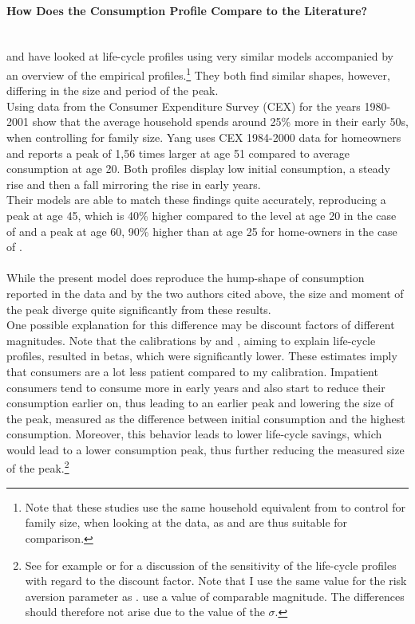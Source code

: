 \documentclass[a4paper,12pt,legno]{article}
\newcommand{\myparagraph}[1]{\paragraph{#1}\mbox{}\\}
\begin{document}
\myparagraph{How Does the Consumption Profile Compare to the Literature?} \cite{FV&K2011} and \cite{yang2009} have looked at life-cycle profiles using very similar models accompanied by an overview of the empirical profiles.\footnote{Note that these studies use the same household equivalent from \cite{fernandez2007consumption} to control for family size, when looking at the data, as \cite{hintermaier2011} and are thus suitable for comparison.} They both find similar shapes, however, differing in the size and period of the peak.\\
Using data from the Consumer Expenditure Survey (CEX) for the years 1980-2001 \cite{FV&K2011} show that the average household spends around 25\% more in their early 50s, when controlling for family size. Yang uses CEX 1984-2000 data for homeowners and reports a peak of 1,56 times larger at age 51 compared to average consumption at age 20. Both profiles display low initial consumption, a steady rise and then a fall mirroring the rise in early years. \\
Their models are able to match these findings quite accurately, reproducing a peak  at age 45, which is 40\% higher compared to the level at age 20 in the case of \cite{FV&K2011} and a peak at age 60, 90\% higher than at age 25 for home-owners in the case of \cite{yang2009}. 
\\ \\
While the present model does reproduce the hump-shape of consumption reported in the data and by the two authors cited above, the size and moment of the peak diverge quite significantly from these results. \\
One possible explanation for this difference may be discount factors of different magnitudes. Note that the calibrations by \cite{FV&K2011} and  \cite{yang2009}, aiming to explain life-cycle profiles, resulted in betas, which were significantly lower. These estimates imply that consumers are a lot less patient compared to my calibration. Impatient consumers tend to consume more in early years and also start to reduce their consumption earlier on, thus leading to an earlier peak and lowering the size of the peak, measured as the difference between initial consumption and the highest consumption. Moreover, this behavior leads to lower life-cycle savings, which would lead to a lower consumption peak, thus further reducing the measured size of the peak.\footnote{See for example \cite{Gourinchas&Parker2002} or \cite{cagetti2003} for a discussion of the sensitivity of the life-cycle profiles with regard to the discount factor. Note that I use the same value for the risk aversion parameter as \cite{yang2009}. \cite{FV&K2011} use a value of comparable magnitude. The differences should therefore not arise due to the value of the $\sigma$.}
\end{document}

